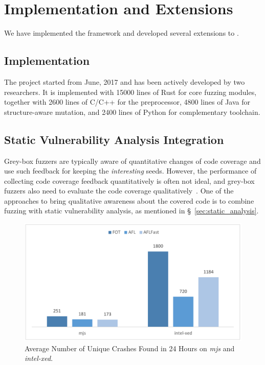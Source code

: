 \section{Implementation and Extensions}\label{sec:app}

We have implemented the {\FOT} framework and developed several extensions to {\FOT}.

\subsection{Implementation}

The {\FOT} project started from June, 2017 and has been actively developed by two researchers. It is implemented with 15000 lines of Rust for core fuzzing modules, together with 2600 lines of C/C++ for the preprocessor, 4800 lines of Java for structure-aware mutation, and 2400 lines of Python for complementary toolchain.



\subsection{Static Vulnerability Analysis Integration}\label{subsec:sva}



Grey-box fuzzers are typically aware of quantitative changes of code coverage and use such feedback for keeping the \textit{interesting} seeds.
However, the performance of collecting code coverage feedback quantitatively is often not ideal, and grey-box fuzzers also need to evaluate the code coverage qualitatively~\cite{Bohme:2016:CGF}.
One of the approaches to bring qualitative awareness about the covered code is to combine fuzzing with static vulnerability analysis, as mentioned in \S~\ref{sec:static_analysis}.

\begin{figure}[!t]
	\centering
	\includegraphics[width=0.75\columnwidth]{res/fot/moo_result.pdf}
	\caption{Average Number of Unique Crashes Found in 24 Hours on \textit{mjs} and \textit{intel-xed}.}
	\label{fig:moo_result}
\end{figure}



